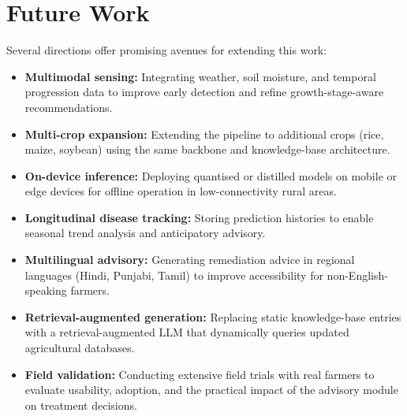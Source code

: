 \documentclass[12pt,a4paper]{report}
\begin{document}
\section{Future Work}
Several directions offer promising avenues for extending this work:
\begin{itemize}
    \item \textbf{Multimodal sensing:} Integrating weather, soil moisture, and temporal progression data to improve early detection and refine growth-stage-aware recommendations.
    \item \textbf{Multi-crop expansion:} Extending the pipeline to additional crops (rice, maize, soybean) using the same backbone and knowledge-base architecture.
    \item \textbf{On-device inference:} Deploying quantised or distilled models on mobile or edge devices for offline operation in low-connectivity rural areas.
    \item \textbf{Longitudinal disease tracking:} Storing prediction histories to enable seasonal trend analysis and anticipatory advisory.
    \item \textbf{Multilingual advisory:} Generating remediation advice in regional languages (Hindi, Punjabi, Tamil) to improve accessibility for non-English-speaking farmers.
    \item \textbf{Retrieval-augmented generation:} Replacing static knowledge-base entries with a retrieval-augmented LLM that dynamically queries updated agricultural databases.
    \item \textbf{Field validation:} Conducting extensive field trials with real farmers to evaluate usability, adoption, and the practical impact of the advisory module on treatment decisions.
\end{itemize}

\end{document}
